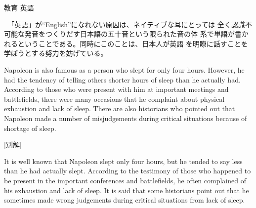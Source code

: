 \documentclass[fleqn]{jbook}
\begin{document}
\begin{answer}{教育 英語}{}
\begin{subanswers}
  　「英語」が``English''になれない原因は、ネイティブな耳にとっては
全く認識不可能な発音をつくりだす日本語の五十音という限られた音の体
系で単語が書かれるということである。同時にこのことは、日本人が英語
を明瞭に話すことを学ぼうとする努力を妨げている。

\SubAnswer
\baselineskip=12pt
Napoleon is also famous as a person who slept for only four
hours. However, he had the tendency of telling others shorter
hours of sleep than he actually had. According to those who were
present with him at important meetings and battlefields, there were 
many occasions that he complaint about physical exhaustion and
lack of sleep. There are also historians who pointed out that
Napoleon made a number of misjudgements during critical situations 
because of shortage of sleep.

[別解]

 It is well known that Napoleon slept only four hours, but he
 tended to say less than he had actually slept. According to the
 testimony of those who happened to be present in the important
 conferences and battlefields, he often complained of his
 exhaustion and lack of sleep. It is said that some historians
 point out that he sometimes made wrong judgements during critical 
 situations from lack of sleep.

\baselineskip=15pt
\end{subanswers}
\end{answer}
\end{document}
